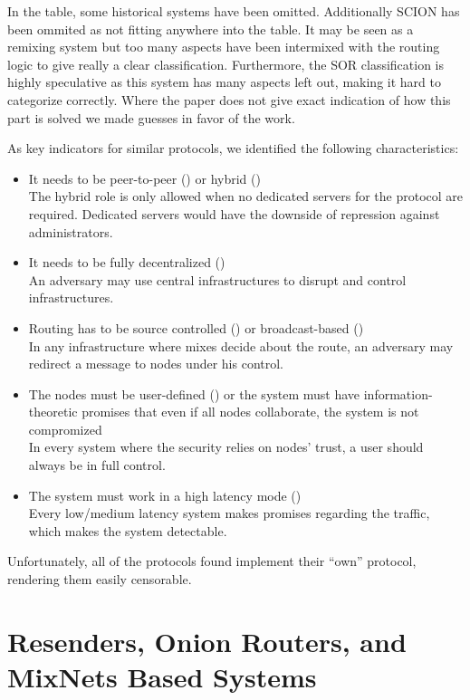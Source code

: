 In the table, some historical systems have been omitted. Additionally SCION has been ommited as not fitting anywhere into the table. It may be seen as a remixing system but too many aspects have been intermixed with the routing logic to give really a clear classification. Furthermore, the SOR classification is highly speculative as this system has many aspects left out, making it hard to categorize correctly. Where the paper does not give exact indication of how this part is solved we made guesses in favor of the work.

As key indicators for similar protocols, we identified the following characteristics:
\begin{itemize}
	\item It needs to be peer-to-peer (\rolePtp) or hybrid (\roleHybrid)\\
	The hybrid role is only allowed when no dedicated servers for the protocol are required. Dedicated servers would have the downside of repression against administrators.
	\item It needs to be fully decentralized (\decentralizationDecentr)\\
	An adversary may use central infrastructures to disrupt and control infrastructures.
	\item Routing has to be source controlled (\routingRoutesrc) or broadcast-based (\routingRoutebc)\\
	In any infrastructure where mixes decide about the route, an adversary may redirect a message to nodes under his control.
	\item The nodes must be user-defined (\nsnodesusr) or the system must have information-theoretic promises that even if all nodes collaborate, the system is not compromized\\
	In every system where the security relies on nodes' trust, a user should always be in full control.
	\item The system must work in a high latency mode (\perflath)\\
	Every low/medium latency system makes promises regarding the traffic, which makes the system detectable.
\end{itemize}

Unfortunately, all of the protocols found implement their ``own'' protocol, rendering them easily censorable. 

\section{Resenders, Onion Routers, and MixNets Based Systems}\label{sec:remailersAndMixnets}
